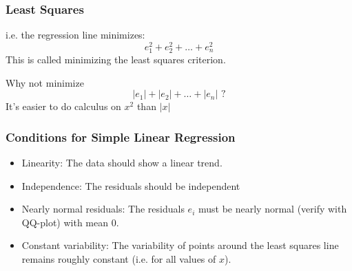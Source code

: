 \documentclass[handout]{beamer}
\newcommand{\blue}[1]{\textcolor{blue2}{#1}}
\begin{document}


\begin{frame}[fragile]
\frametitle{Least Squares}
%
%
i.e. the regression line minimizes:
\[
e_1^2 + e_2^2 + \ldots + e_n^2
\]
This is called \blue{minimizing the least squares criterion}.


\pause Why not minimize
\[
|e_1| + |e_2| + \ldots + |e_n| \mbox{ ?}
\]
It's easier to do calculus on $x^2$ than $|x|$
\end{frame}


\begin{frame}[fragile]
\frametitle{Conditions for Simple Linear Regression}
%

\begin{itemize}
\pause\item \blue{Linearity}: The data should show a linear trend.  
\pause\item \blue{Independence}: The residuals should be independent
\pause\item \blue{Nearly normal residuals}: The residuals $e_i$ must be nearly normal (verify with QQ-plot) with mean 0.  
\pause\item \blue{Constant variability}:  The variability of points around the least squares line remains roughly constant (i.e. for all values of $x$).
\end{itemize}

\end{frame}
\end{document}
